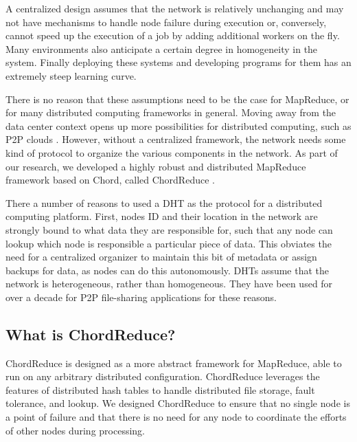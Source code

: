 A centralized design assumes that the network is relatively unchanging and may not have mechanisms to handle node failure during execution or, conversely, cannot speed up the execution of a job by adding additional workers on the fly.  
Many environments also anticipate a certain degree in homogeneity in the system.
Finally deploying these systems and developing programs for them has an extremely steep learning curve.

There is no reason that these assumptions need to be the case for MapReduce, or for many distributed computing frameworks in general.
Moving away from the data center context opens up more possibilities for distributed computing, such as P2P clouds \cite{p2p-cloud}.
However, without a centralized framework, the network needs some kind of protocol to organize the various components in the network.
As part of our research, we developed a highly robust and distributed MapReduce framework based on Chord, called ChordReduce \cite{chordreduce}.

There a number of reasons to used a DHT as the protocol for a distributed computing platform.
First, nodes ID and their location in the network are strongly bound to what data they are responsible for, such that any node can lookup which node is responsible a particular piece of data.
This obviates the need for a centralized organizer to maintain this bit of metadata or assign backups for data, as nodes can do this autonomously.
DHTs assume that the network is heterogeneous, rather than homogeneous.
They have been used for over a decade for P2P file-sharing applications for these reasons.




\subsection{What is ChordReduce?}

ChordReduce is designed as a more abstract framework for MapReduce, able to run on any arbitrary distributed configuration.
ChordReduce leverages the features of distributed hash tables to handle distributed file storage, fault tolerance, and lookup.  
We designed ChordReduce to ensure that no single node is a point of failure and that there is no need for any node to coordinate the efforts of other nodes during processing.



